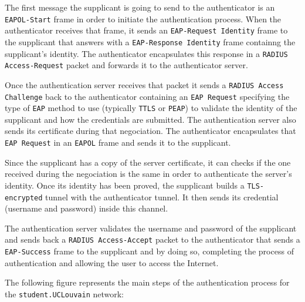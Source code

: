 The first message the supplicant is going to send to the authenticator is an \texttt{EAPOL-Start} frame in order to initiate the authentication process. When the authenticator receives that frame, it sends an \texttt{EAP-Request Identity} frame to the supplicant that answers with a \texttt{EAP-Response Identity} frame containng the supplicant's identity. The authenticator encapsulates this response in a \texttt{RADIUS Access-Request} packet and forwards it to the authenticator server.

Once the authentication server receives that packet it sends a \texttt{RADIUS Access Challenge} back to the authenticator containing an \texttt{EAP Request} specifying the type of \texttt{EAP} method to use (typically \texttt{TTLS} or \texttt{PEAP}) to validate the identity of the supplicant and how the credentials are submitted. The authentication server also sends its certificate during that negociation. The authenticator encapsulates that \texttt{EAP Request} in an \texttt{EAPOL} frame and sends it to the supplicant.

Since the supplicant has a copy of the server certificate, it can checks if the one received during the negociation is the same in order to authenticate the server's identity. Once its identity has been proved, the supplicant builds a \texttt{TLS-encrypted} tunnel with the authenticator tunnel. It then sends its credential (username and password) inside this channel.

The authentication server validates the username and password of the supplicant and sends back a \texttt{RADIUS Access-Accept} packet to the authenticator that sends a \texttt{EAP-Success} frame to the supplicant and by doing so, completing the process of authentication and allowing the user to access the Internet.

The following figure represents the main steps of the authentication process for the \texttt{student.UCLouvain} network:

